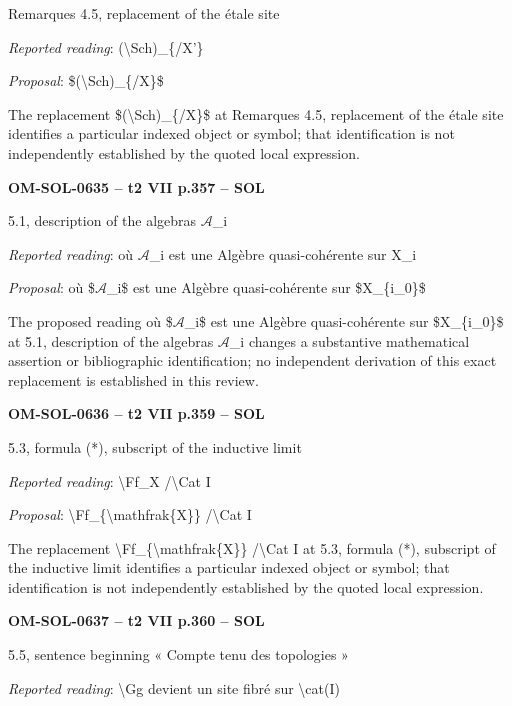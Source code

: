 Remarques 4.5, replacement of the étale site\par
\emph{Reported reading}: (\textbackslash{}Sch)\_\{/X'\}\par
\emph{Proposal}: \$(\textbackslash{}Sch)\_\{/X\}\$\par
The replacement \$(\textbackslash{}Sch)\_\{/X\}\$ at Remarques 4.5, replacement of the étale site identifies a particular indexed object or symbol; that identification is not independently established by the quoted local expression.\par
\par\noindent\textbf{OM-SOL-0635 -- t2 VII p.357 -- SOL}\par
5.1, description of the algebras \ensuremath{𝒜}\_i\par
\emph{Reported reading}: où \ensuremath{𝒜}\_i est une Algèbre quasi-cohérente sur X\_i\par
\emph{Proposal}: où \$\ensuremath{𝒜}\_i\$ est une Algèbre quasi-cohérente sur \$X\_\{i\_0\}\$\par
The proposed reading où \$\ensuremath{𝒜}\_i\$ est une Algèbre quasi-cohérente sur \$X\_\{i\_0\}\$ at 5.1, description of the algebras \ensuremath{𝒜}\_i changes a substantive mathematical assertion or bibliographic identification; no independent derivation of this exact replacement is established in this review.\par
\par\noindent\textbf{OM-SOL-0636 -- t2 VII p.359 -- SOL}\par
5.3, formula (*), subscript of the inductive limit\par
\emph{Reported reading}: \textbackslash{}Ff\_X /\textbackslash{}Cat I\par
\emph{Proposal}: \textbackslash{}Ff\_\{\textbackslash{}mathfrak\{X\}\} /\textbackslash{}Cat I\par
The replacement \textbackslash{}Ff\_\{\textbackslash{}mathfrak\{X\}\} /\textbackslash{}Cat I at 5.3, formula (*), subscript of the inductive limit identifies a particular indexed object or symbol; that identification is not independently established by the quoted local expression.\par
\par\noindent\textbf{OM-SOL-0637 -- t2 VII p.360 -- SOL}\par
5.5, sentence beginning « Compte tenu des topologies »\par
\emph{Reported reading}: \textbackslash{}Gg devient un site fibré sur \textbackslash{}cat(I)\par
